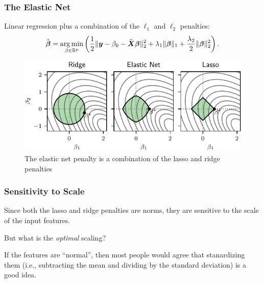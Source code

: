 \documentclass[10pt]{beamer}
\begin{document}
\begin{frame}[c]
  \frametitle{The Elastic Net}

  Linear regression plus a combination of the \(\ell_1\) and \(\ell_2\) penalties:
  \begin{equation*}
    \hat{\boldsymbol{\beta}} = \operatorname*{arg\,min}_{\beta \in \mathbb{R}^p} \left( \frac{1}{2} \lVert \boldsymbol y - \beta_0 - \tilde{\boldsymbol{X}}\boldsymbol{\beta} \rVert^2_2  + \lambda_1 \lVert \boldsymbol\beta \rVert_1 + \frac{\lambda_2}{2}\lVert \boldsymbol \beta \rVert_2^2\right).
  \end{equation*}

  \pause


  \begin{figure}
    \centering
    \includegraphics[]{figures/elasticnet-balls.pdf}
    \caption{%
      The elastic net penalty is a combination of the lasso and ridge penalties
    }
  \end{figure}

\end{frame}

\begin{frame}[c]
  \frametitle{Sensitivity to Scale}

  Since both the lasso and ridge penalties are norms, they are sensitive to the scale of the input features.

  \medskip

  But what is the \emph{optimal} scaling?

  \medskip

  If the features are ``normal'', then most people would agree that stanardizing them (i.e., subtracting the mean and dividing by the standard deviation) is a good idea.
\end{frame}
\end{document}
